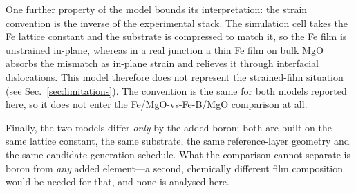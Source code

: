 One further property of the model bounds its interpretation: the strain convention is the
inverse of the experimental stack. The simulation cell takes the Fe lattice constant and the
substrate is compressed to match it, so the Fe film is unstrained in-plane, whereas in a
real junction a thin Fe film on bulk MgO absorbs the mismatch as in-plane strain and relieves it
through interfacial dislocations. This model therefore does not represent the strained-film
situation (see Sec.~\ref{sec:limitations}). The convention is the same for both models reported
here, so it does not enter the Fe/MgO-vs-Fe-B/MgO comparison at all.

Finally, the two models differ \emph{only} by the added boron: both are built on the same lattice
constant, the same substrate, the same reference-layer geometry and the same candidate-generation
schedule. What the comparison cannot separate is boron from \emph{any} added element---a second,
chemically different film composition would be needed for that, and none is analysed here.
